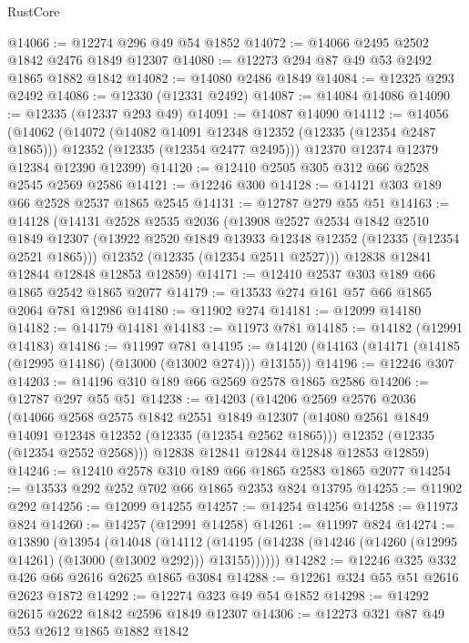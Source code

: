 \begin{lexlean}{RustCore}
\begin{coremodule}
@14066 := @12274 @296 @49 @54 @1852
@14072 := @14066 @2495 @2502 @1842 @2476 @1849 @12307
@14080 := @12273 @294 @87 @49 @53 @2492 @1865 @1882 @1842
@14082 := @14080 @2486 @1849
@14084 := @12325 @293 @2492
@14086 := @12330 (@12331 @2492)
@14087 := @14084 @14086
@14090 := @12335 (@12337 @293 @49)
@14091 := @14087 @14090
@14112 := @14056
    (@14062
      (@14072
        (@14082 @14091 @12348 @12352 (@12335 (@12354 @2487 @1865)))
        @12352
        (@12335 (@12354 @2477 @2495)))
      @12370
      @12374
      @12379
      @12384
      @12390
      @12399)
@14120 := @12410 @2505 @305 @312 @66 @2528 @2545 @2569 @2586
@14121 := @12246 @300
@14128 := @14121 @303 @189 @66 @2528 @2537 @1865 @2545
@14131 := @12787 @279 @55 @51
@14163 := @14128
    (@14131
      @2528
      @2535
      @2036
      (@13908
        @2527
        @2534
        @1842
        @2510
        @1849
        @12307
        (@13922 @2520 @1849 @13933 @12348 @12352 (@12335 (@12354 @2521 @1865)))
        @12352
        (@12335 (@12354 @2511 @2527)))
      @12838
      @12841
      @12844
      @12848
      @12853
      @12859)
@14171 := @12410 @2537 @303 @189 @66 @1865 @2542 @1865 @2077
@14179 := @13533 @274 @161 @57 @66 @1865 @2064 @781 @12986
@14180 := @11902 @274
@14181 := @12099 @14180
@14182 := @14179 @14181
@14183 := @11973 @781
@14185 := @14182 (@12991 @14183)
@14186 := @11997 @781
@14195 := @14120 (@14163 (@14171 (@14185 (@12995 @14186) (@13000 (@13002 @274))) @13155))
@14196 := @12246 @307
@14203 := @14196 @310 @189 @66 @2569 @2578 @1865 @2586
@14206 := @12787 @297 @55 @51
@14238 := @14203
    (@14206
      @2569
      @2576
      @2036
      (@14066
        @2568
        @2575
        @1842
        @2551
        @1849
        @12307
        (@14080 @2561 @1849 @14091 @12348 @12352 (@12335 (@12354 @2562 @1865)))
        @12352
        (@12335 (@12354 @2552 @2568)))
      @12838
      @12841
      @12844
      @12848
      @12853
      @12859)
@14246 := @12410 @2578 @310 @189 @66 @1865 @2583 @1865 @2077
@14254 := @13533 @292 @252 @702 @66 @1865 @2353 @824 @13795
@14255 := @11902 @292
@14256 := @12099 @14255
@14257 := @14254 @14256
@14258 := @11973 @824
@14260 := @14257 (@12991 @14258)
@14261 := @11997 @824
@14274 := @13890
    (@13954
      (@14048
        (@14112 (@14195 (@14238 (@14246 (@14260 (@12995 @14261) (@13000 (@13002 @292))) @13155))))))
@14282 := @12246 @325 @332 @426 @66 @2616 @2625 @1865 @3084
@14288 := @12261 @324 @55 @51 @2616 @2623 @1872
@14292 := @12274 @323 @49 @54 @1852
@14298 := @14292 @2615 @2622 @1842 @2596 @1849 @12307
@14306 := @12273 @321 @87 @49 @53 @2612 @1865 @1882 @1842

\end{coremodule}
\end{lexlean}
